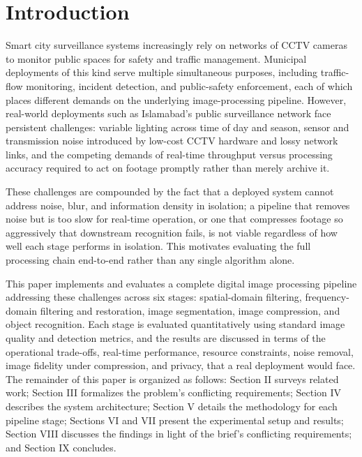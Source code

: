 \documentclass[conference]{IEEEtran}
\begin{document}
\section{Introduction}
Smart city surveillance systems increasingly rely on networks of CCTV cameras to monitor public spaces for safety and traffic management. Municipal deployments of this kind serve multiple simultaneous purposes, including traffic-flow monitoring, incident detection, and public-safety enforcement, each of which places different demands on the underlying image-processing pipeline. However, real-world deployments such as Islamabad's public surveillance network face persistent challenges: variable lighting across time of day and season, sensor and transmission noise introduced by low-cost CCTV hardware and lossy network links, and the competing demands of real-time throughput versus processing accuracy required to act on footage promptly rather than merely archive it.

These challenges are compounded by the fact that a deployed system cannot address noise, blur, and information density in isolation; a pipeline that removes noise but is too slow for real-time operation, or one that compresses footage so aggressively that downstream recognition fails, is not viable regardless of how well each stage performs in isolation. This motivates evaluating the full processing chain end-to-end rather than any single algorithm alone.

This paper implements and evaluates a complete digital image processing pipeline addressing these challenges across six stages: spatial-domain filtering, frequency-domain filtering and restoration, image segmentation, image compression, and object recognition. Each stage is evaluated quantitatively using standard image quality and detection metrics, and the results are discussed in terms of the operational trade-offs, real-time performance, resource constraints, noise removal, image fidelity under compression, and privacy, that a real deployment would face. The remainder of this paper is organized as follows: Section II surveys related work; Section III formalizes the problem's conflicting requirements; Section IV describes the system architecture; Section V details the methodology for each pipeline stage; Sections VI and VII present the experimental setup and results; Section VIII discusses the findings in light of the brief's conflicting requirements; and Section IX concludes.
\end{document}
